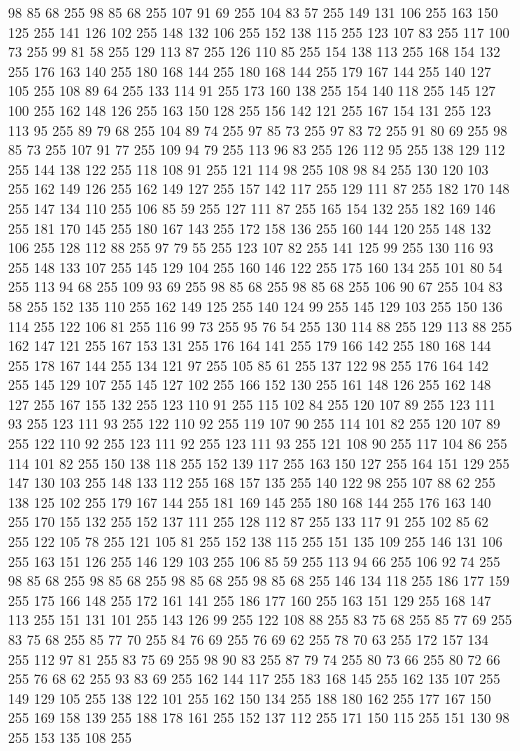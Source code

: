 98 85 68 255 98 85 68 255 107 91 69 255 104 83 57 255 149 131 106 255 163 150 125 255 141 126 102 255 148 132 106 255 152 138 115 255 123 107 83 255 117 100 73 255 99 81 58 255 129 113 87 255 126 110 85 255 154 138 113 255 168 154 132 255 176 163 140 255 180 168 144 255 180 168 144 255 179 167 144 255 140 127 105 255 108 89 64 255 133 114 91 255 173 160 138 255 154 140 118 255 145 127 100 255 162 148 126 255 163 150 128 255 156 142 121 255 167 154 131 255 123 113 95 255 89 79 68 255 104 89 74 255 97 85 73 255 97 83 72 255 91 80 69 255 98 85 73 255 107 91 77 255 109 94 79 255 113 96 83 255 126 112 95 255 138 129 112 255 144 138 122 255 118 108 91 255 121 114 98 255 108 98 84 255 130 120 103 255 162 149 126 255 162 149 127 255 157 142 117 255 129 111 87 255 182 170 148 255 147 134 110 255 106 85 59 255 127 111 87 255 165 154 132 255 182 169 146 255 181 170 145 255 180 167 143 255 172 158 136 255 160 144 120 255 148 132 106 255 128 112 88 255 97 79 55 255
123 107 82 255 141 125 99 255 130 116 93 255 148 133 107 255 145 129 104 255 160 146 122 255 175 160 134 255 101 80 54 255 113 94 68 255 109 93 69 255 98 85 68 255 98 85 68 255 106 90 67 255 104 83 58 255 152 135 110 255 162 149 125 255 140 124 99 255 145 129 103 255 150 136 114 255 122 106 81 255 116 99 73 255 95 76 54 255 130 114 88 255 129 113 88 255 162 147 121 255 167 153 131 255 176 164 141 255 179 166 142 255 180 168 144 255 178 167 144 255 134 121 97 255 105 85 61 255 137 122 98 255 176 164 142 255 145 129 107 255 145 127 102 255 166 152 130 255 161 148 126 255 162 148 127 255 167 155 132 255 123 110 91 255 115 102 84 255 120 107 89 255 123 111 93 255 123 111 93 255 122 110 92 255 119 107 90 255 114 101 82 255 120 107 89 255 122 110 92 255 123 111 92 255 123 111 93 255 121 108 90 255 117 104 86 255 114 101 82 255 150 138 118 255 152 139 117 255 163 150 127 255 164 151 129 255 147 130 103 255 148 133 112 255 168 157 135 255 140 122 98 255 107 88 62 255
138 125 102 255 179 167 144 255 181 169 145 255 180 168 144 255 176 163 140 255 170 155 132 255 152 137 111 255 128 112 87 255 133 117 91 255 102 85 62 255 122 105 78 255 121 105 81 255 152 138 115 255 151 135 109 255 146 131 106 255 163 151 126 255 146 129 103 255 106 85 59 255 113 94 66 255 106 92 74 255 98 85 68 255 98 85 68 255 98 85 68 255 98 85 68 255 146 134 118 255 186 177 159 255 175 166 148 255 172 161 141 255 186 177 160 255 163 151 129 255 168 147 113 255 151 131 101 255 143 126 99 255 122 108 88 255 83 75 68 255 85 77 69 255 83 75 68 255 85 77 70 255 84 76 69 255 76 69 62 255 78 70 63 255 172 157 134 255 112 97 81 255 83 75 69 255 98 90 83 255 87 79 74 255 80 73 66 255 80 72 66 255 76 68 62 255 93 83 69 255 162 144 117 255 183 168 145 255 162 135 107 255 149 129 105 255 138 122 101 255 162 150 134 255 188 180 162 255 177 167 150 255 169 158 139 255 188 178 161 255 152 137 112 255 171 150 115 255 151 130 98 255 153 135 108 255
